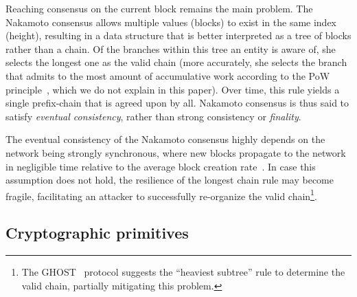 Reaching consensus on the current block remains the main problem. The Nakamoto consensus allows multiple values (blocks) to exist in the same index (height), resulting in a data structure that is better interpreted as a tree of blocks rather than a chain. Of the branches within this tree an entity is aware of, she selects the longest one as the valid chain (more accurately, she selects the branch that admits to the most amount of accumulative work according to the PoW principle~\cite{PoW}, which we do not explain in this paper). Over time, this rule yields a single prefix-chain that is agreed upon by all. Nakamoto consensus is thus said to satisfy \emph{eventual consistency}, rather than strong consistency or \emph{finality}. 

The eventual consistency of the Nakamoto consensus highly depends on the network being strongly synchronous, where new blocks propagate to the network in negligible time relative to the average block creation rate~\cite{AsyncAnalysisBlockchain}. In case this assumption does not hold, the resilience of the longest chain rule may become fragile, facilitating an attacker to successfully re-organize the valid chain\footnote{The GHOST~\cite{Ghost} protocol suggests the ``heaviest subtree'' rule to determine the valid chain, partially mitigating this problem.}.

\subsection{Cryptographic primitives}
\label{section_cryptoprimitives}
